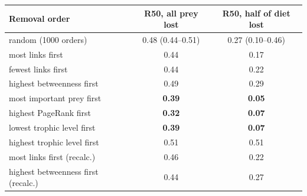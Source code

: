 \begin{tabular}{lcc}
\hline
Removal order & R50, all prey lost & R50, half of diet lost \\
\hline
random (1000 orders) & 0.48 (0.44--0.51) & 0.27 (0.10--0.46) \\
most links first & 0.44 & 0.17 \\
fewest links first & 0.44 & 0.22 \\
highest betweenness first & 0.49 & 0.29 \\
most important prey first & \textbf{0.39} & \textbf{0.05} \\
highest PageRank first & \textbf{0.32} & \textbf{0.07} \\
lowest trophic level first & \textbf{0.39} & \textbf{0.07} \\
highest trophic level first & 0.51 & 0.51 \\
most links first (recalc.) & 0.46 & 0.22 \\
highest betweenness first (recalc.) & 0.44 & 0.27 \\
\hline
\end{tabular}
